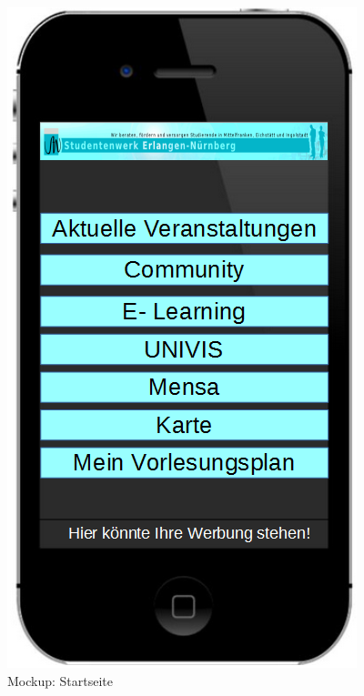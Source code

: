 \begin{figure}[h]
    \centering
    \includegraphics[scale=0.4]{./inc/aufgabe05/MockupStartseite} 
    \caption{Mockup: Startseite}
\end{figure}

